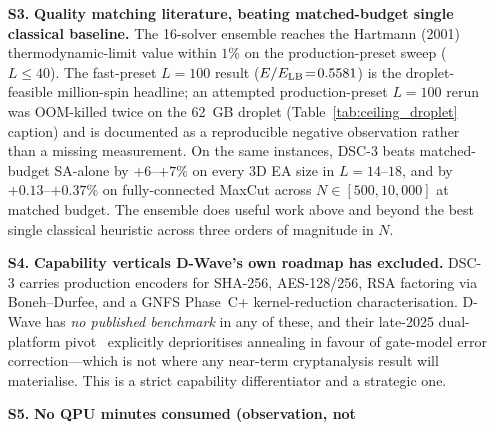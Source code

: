 \documentclass[11pt,a4paper]{article}
\begin{document}
\begin{enumerate}
  ($n\!=\!4$, droplet). The corresponding D-Wave Advantage2 all-in
  floor (amortised capex + power) is $\sim$\$229--343/hour; the
  reported Leap pricing tiers imply a \$0.05--\$1.30/solve floor.
  The cumulative ratios:
  \begin{itemize}\itemsep0.05em
  \item[$\circ$] \emph{capex}: \$10--15M list (Advantage2 system) vs.\
    \$1.57/hour Leap on demand or $\sim\!\$5K$ for a workstation
    capable of replicating this paper's headline result ($\sim\!10^{6}$
    ratio in fixed-cost-per-machine);
  \item[$\circ$] \emph{per-solve}: $\sim\!10^{2}$--$10^{5}\times$
    cheaper at every scale we measured;
  \item[$\circ$] \emph{energy}: $\sim\!42\times$ at full system load
    (12.5~kW vs.\ 300~W).
  \end{itemize}
\item[\textbf{S3.}] \textbf{Quality matching literature, beating
  matched-budget single classical baseline.} The 16-solver ensemble
  reaches the Hartmann (2001) thermodynamic-limit value within $1\%$
  on the production-preset sweep ($L\!\le\!40$). The fast-preset
  $L\!=\!100$ result ($E/E_{\rm LB}\!=\!0.5581$) is the droplet-feasible
  million-spin headline; an attempted production-preset $L\!=\!100$
  rerun was OOM-killed twice on the 62~GB droplet
  (Table~\ref{tab:ceiling_droplet} caption) and is documented as a
  reproducible negative observation rather than a missing measurement.
  On the same instances, DSC-3 beats matched-budget SA-alone by
  $+6$--$+7\%$ on every 3D EA size in $L\!=\!14$--$18$, and by
  $+0.13$--$+0.37\%$ on fully-connected MaxCut across
  $N\!\in\![500, 10{,}000]$ at matched budget. The ensemble does useful
  work above and beyond the best single classical heuristic across
  three orders of magnitude in $N$.
\item[\textbf{S4.}] \textbf{Capability verticals D-Wave's own roadmap
  has excluded.} DSC-3 carries production encoders for SHA-256,
  AES-128/256, RSA factoring via Boneh--Durfee, and a GNFS Phase~C+
  kernel-reduction characterisation. D-Wave has \emph{no published
  benchmark} in any of these, and their late-2025 dual-platform
  pivot~\cite{dwave_dual_platform} explicitly deprioritises annealing
  in favour of gate-model error correction---which is not where any
  near-term cryptanalysis result will materialise. This is a strict
  capability differentiator and a strategic one.
\item[\textbf{S5.}] \textbf{No QPU minutes consumed (observation, not
}
\end{enumerate}
\end{document}

